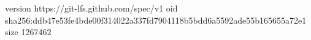 version https://git-lfs.github.com/spec/v1
oid sha256:ddb47e53fe4bde00f314022a337fd7904118b5bdd6a5592ade55b165655a72e1
size 1267462
